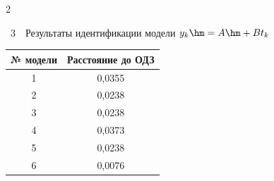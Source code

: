\begin{multicols}{2}






\begin{center}

\vspace*{-1pt}



\noindent

\parbox{150pt}{{{\tablename~3}\ \ \small{Результаты идентификации модели $y_k\hm= A\hm+Bt_k$}}

}



\vspace*{6pt}



{\small

\begin{tabular}{|c|c|}

\hline

№ модели&Расстояние до ОДЗ\\

\hline

1&0,0355\\

2&0,0238\\

3&0,0238\\

4&0,0373\\

5&0,0238\\

6&0,0076\\

\hline

\end{tabular}

\vspace*{6pt}

}

\end{center}







\addtocounter{table}{1}




\end{multicols}
